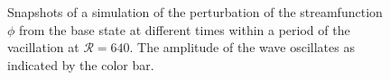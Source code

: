 \begin{figure}[t]
\centering
{}
\hspace{8pt}
\hspace{8pt}
\hspace{8pt}
\caption{Snapshots of a simulation of the perturbation of the streamfunction $\phi$ from the base state at different times within a period of the vacillation at $\mathcal{R} = 640$. The amplitude of the wave oscillates as indicated by the color bar. }
\label{snap}
\end{figure}


